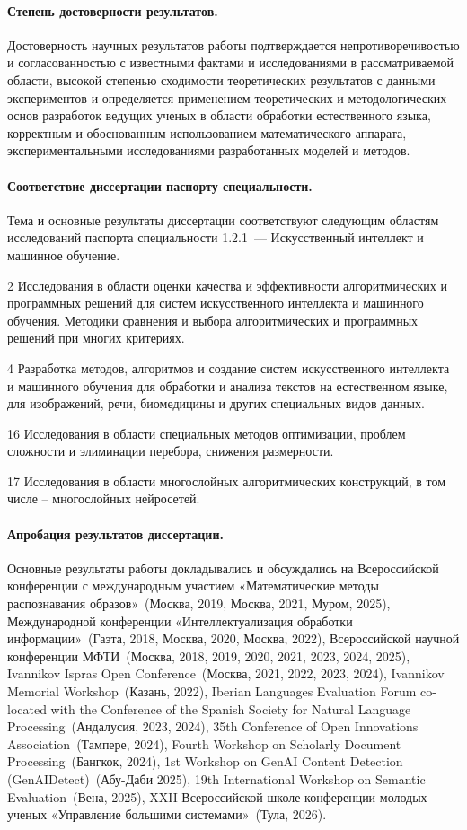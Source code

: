 \paragraph{Степень достоверности результатов.}
Достоверность научных результатов работы подтверждается непротиворечивостью и согласованностью с известными фактами и исследованиями в рассматриваемой области, высокой степенью сходимости теоретических результатов с данными экспериментов и определяется применением теоретических и методологических основ разработок ведущих ученых в области обработки естественного языка, корректным и обоснованным использованием математического аппарата, экспериментальными исследованиями разработанных моделей и методов.

\paragraph{Соответствие диссертации паспорту специальности.}
Тема и основные результаты диссертации соответствуют следующим областям исследований паспорта специальности 1.2.1~--- Искусственный интеллект и машинное обучение.

2 Исследования в области оценки качества и эффективности алгоритмических и программных решений для систем искусственного интеллекта и машинного обучения. Методики сравнения и выбора алгоритмических и программных решений при многих критериях.

4 Разработка методов, алгоритмов и создание систем искусственного интеллекта и машинного обучения для обработки и анализа текстов на естественном языке, для изображений, речи, биомедицины и других специальных видов данных.

16 Исследования в области специальных методов оптимизации, проблем сложности и элиминации перебора, снижения размерности.

17 Исследования в области многослойных алгоритмических конструкций, в том числе – многослойных нейросетей.

\paragraph{Апробация результатов диссертации.}
Основные результаты работы докладывались и обсуждались на Всероссийской конференции с международным участием «Математические методы распознавания образов»~(Москва, 2019, Москва, 2021, Муром, 2025), Международной конференции «Интеллектуализация обработки информации»~(Гаэта, 2018, Москва, 2020, Москва, 2022), Всероссийской научной конференции МФТИ~(Москва, 2018, 2019, 2020, 2021, 2023, 2024, 2025), Ivannikov Ispras Open Conference~(Москва, 2021, 2022, 2023, 2024), Ivannikov Memorial Workshop~(Казань, 2022), Iberian Languages Evaluation Forum co-located with the Conference of the Spanish Society for Natural Language Processing~(Андалусия, 2023, 2024), 35th Conference of Open Innovations Association~(Тампере, 2024), Fourth Workshop on Scholarly Document Processing~(Бангкок, 2024), 1st Workshop on GenAI Content Detection (GenAIDetect)~(Абу-Даби 2025), 19th International Workshop on Semantic Evaluation~(Вена, 2025), XXII Всероссийской школе-конференции молодых ученых «Управление большими системами»~(Тула, 2026).

